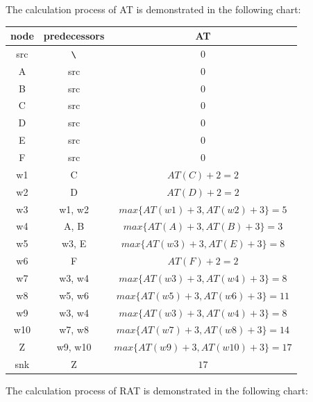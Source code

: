 \documentclass[12pt]{article}
\begin{document}
    The calculation process of AT is demonstrated in the following chart:

    \begin{center}
    \begin{tabular}{|c|c|c|}
        \hline
        node & predecessors & AT \\
        \hline
        src & $\verb|\|$ & $0$ \\
        \hline
        A & src & $0$ \\
        \hline
        B & src & $0$ \\
        \hline
        C & src & $0$ \\
        \hline
        D & src & $0$ \\
        \hline
        E & src & $0$ \\
        \hline
        F & src & $0$ \\
        \hline
        w1 & C & $AT(C)+2=2$ \\
        \hline
        w2 & D & $AT(D)+2=2$ \\
        \hline
        w3 & w1, w2 & $max\{AT(w1)+3,AT(w2)+3\}=5$ \\
        \hline
        w4 & A, B & $max\{AT(A)+3,AT(B)+3\}=3$ \\
        \hline
        w5 & w3, E & $max\{AT(w3)+3,AT(E)+3\}=8$ \\
        \hline
        w6 & F & $AT(F)+2=2$ \\
        \hline
        w7 & w3, w4 & $max\{AT(w3)+3,AT(w4)+3\}=8$ \\
        \hline
        w8 & w5, w6 & $max\{AT(w5)+3,AT(w6)+3\}=11$ \\
        \hline
        w9 & w3, w4 & $max\{AT(w3)+3,AT(w4)+3\}=8$ \\
        \hline
        w10 & w7, w8 & $max\{AT(w7)+3,AT(w8)+3\}=14$ \\
        \hline
        Z & w9, w10 & $max\{AT(w9)+3,AT(w10)+3\}=17$ \\
        \hline
        snk & Z & $17$ \\
        \hline
    \end{tabular}
    \end{center}

    \vspace{12pt}

    The calculation process of RAT is demonstrated in the following chart:
\end{document}
